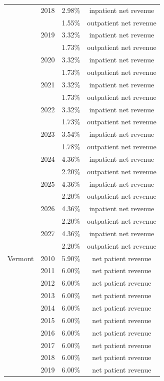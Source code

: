 \begin{longtable}{llcc}
 & 2018 & 2.98\% & inpatient net revenue \\[0pt]
 &  & 1.55\% & outpatient net revenue \\[0pt]
 & 2019 & 3.32\% & inpatient net revenue \\[0pt]
 &  & 1.73\% & outpatient net revenue \\[0pt]
 & 2020 & 3.32\% & inpatient net revenue \\[0pt]
 &  & 1.73\% & outpatient net revenue \\[0pt]
 & 2021 & 3.32\% & inpatient net revenue \\[0pt]
 &  & 1.73\% & outpatient net revenue \\[0pt]
 & 2022 & 3.32\% & inpatient net revenue \\[0pt]
 &  & 1.73\% & outpatient net revenue \\[0pt]
 & 2023 & 3.54\% & inpatient net revenue \\[0pt]
 &  & 1.78\% & outpatient net revenue \\[0pt]
 & 2024 & 4.36\% & inpatient net revenue \\[0pt]
 &  & 2.20\% & outpatient net revenue \\[0pt]
 & 2025 & 4.36\% & inpatient net revenue \\[0pt]
 &  & 2.20\% & outpatient net revenue \\[0pt]
 & 2026 & 4.36\% & inpatient net revenue \\[0pt]
 &  & 2.20\% & outpatient net revenue \\[0pt]
 & 2027 & 4.36\% & inpatient net revenue \\[0pt]
 &  & 2.20\% & outpatient net revenue \\[0pt]
\midrule
Vermont & 2010 & 5.90\% & net patient revenue \\[0pt]
 & 2011 & 6.00\% & net patient revenue \\[0pt]
 & 2012 & 6.00\% & net patient revenue \\[0pt]
 & 2013 & 6.00\% & net patient revenue \\[0pt]
 & 2014 & 6.00\% & net patient revenue \\[0pt]
 & 2015 & 6.00\% & net patient revenue \\[0pt]
 & 2016 & 6.00\% & net patient revenue \\[0pt]
 & 2017 & 6.00\% & net patient revenue \\[0pt]
 & 2018 & 6.00\% & net patient revenue \\[0pt]
 & 2019 & 6.00\% & net patient revenue \\[0pt]

\end{longtable}
